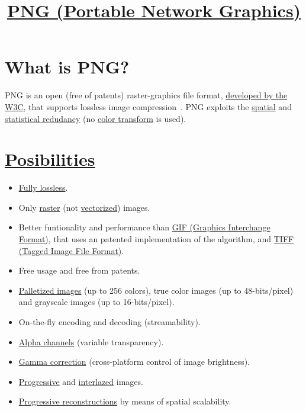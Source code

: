 \title{\href{http://www.libpng.org/pub/png}{PNG (Portable
  Network Graphics)}}

\maketitle
\tableofcontents

\section{What is PNG?}
PNG is an open (free of patents) raster-graphics file
format, \href{https://en.wikipedia.org/wiki/Portable_Network_Graphics}{developed
by the W3C}, that supports lossless image
compression~\cite{roelofs1999png}. PNG exploits the
\href{https://en.wikipedia.org/wiki/Image_compression}{spatial} and
\href{https://en.wikipedia.org/wiki/Data_compression}{statistical
  redudancy} (no \href{https://en.wikipedia.org/wiki/YUV}{color
transform} is used).

\section{\href{http://www.libpng.org/pub/png/book/}{Posibilities}}
\begin{itemize}
\item \href{https://en.wikipedia.org/wiki/Lossless_compression}{Fully
  lossless}.
\item Only
  \href{https://en.wikipedia.org/wiki/Raster_graphics}{raster} (not
  \href{https://en.wikipedia.org/wiki/Vector_graphics}{vectorized})
  images.
\item Better funtionality and performance than
  \href{https://en.wikipedia.org/wiki/GIF}{GIF (Graphics Interchange
    Format)}, that uses an patented implementation of the
   algorithm, and
  \href{https://en.wikipedia.org/wiki/TIFF}{TIFF (Tagged Image File
    Format)}.
\item Free usage and free from patents.
\item
  \href{https://en.wikipedia.org/wiki/Palette_(computing)}{Palletized
    images} (up to 256 colors), true color images (up to
  48-bits/pixel) and grayscale images (up to 16-bits/pixel).
\item On-the-fly encoding and decoding (streamability).
\item \href{https://en.wikipedia.org/wiki/Alpha_compositing}{Alpha
  channels} (variable transparency).
\item \href{https://en.wikipedia.org/wiki/Gamma_correction}{Gamma
  correction} (cross-platform control of image brightness).
\item
  \href{https://en.wikipedia.org/wiki/Progressive_scan}{Progressive}
  and
  \href{https://en.wikipedia.org/wiki/Interlacing_(bitmaps)}{interlazed}
  images.
\item
  \href{http://www.libpng.org/pub/png/book/chapter08.html#png.ch08.div.6}{Progressive
    reconstructions} by means of spatial scalability.
\end{itemize} 

